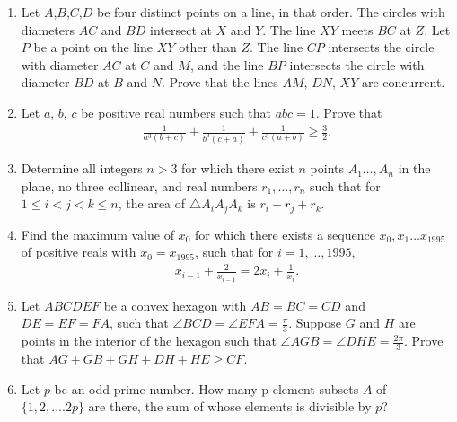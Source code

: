 \documentclass{article}
\begin{document}
\begin{enumerate}
\item Let $A$,$B$,$C$,$D$ be four distinct points on a line, in that order. The circles with diameters $AC$ and $BD$ intersect at $X$ and $Y$. The line $XY$ meets $BC$ at $Z$. Let $P$ be a point on the line $XY$ other than $Z$. The line $CP$ intersects the circle with diameter $AC$ at $C$ and $M$, and the line $BP$ intersects the circle with diameter $BD$ at $B$ and $N$. Prove that the lines $AM$, $DN$, $XY$ are concurrent.
\item Let $a$, $b$, $c$ be positive real numbers such that $abc=1$. Prove that \\ 
\begin{align*}	
\frac{1}{a^3(b+c)}+\frac{1}{b^3(c+a)}+\frac{1}{c^3(a+b)}\geq\frac{3}{2}.
\end{align*}
\item Determine all integers $n>3$ for which there exist $n$ points $A_1\dots,A_n$ in the plane, no three collinear, and real numbers $r_1,\dots,r_n$ such that for $1\leq{i}<{j}<{k}\leq{n}$, the area of $\triangle A_iA_jA_k$ is $r_i+r_j+r_k$.
\item Find the maximum value of $x_{0}$ for which there exists a sequence $x_{0},x_{1}\dots x_{1995}$ of positive reals with $x_{0}=x_{1995}$, such that for $i=1,\dots,1995$,
\begin{align*}
x_{i-1}+\frac{2}{x_{i-1}}=2x_i+\frac{1}{x_i}. 
\end{align*}
\item Let $ABCDEF$ be a convex hexagon with $AB=BC=CD$ and $DE=EF=FA$, such that $\angle{BCD}=\angle{EFA}=\frac{\pi}{3}$. Suppose $G$ and $H$ are points in the interior of the hexagon such that $\angle{AGB}=\angle{DHE}=\frac{2\pi}{3}$. Prove that $AG+GB+GH+DH+HE\geq CF$.
\item Let $p$ be an odd prime number. How many p-element subsets $A$ of $\{1,2,....2p\}$ are there, the sum of whose elements is divisible by $p$? 
\end{enumerate}
\end{document}
